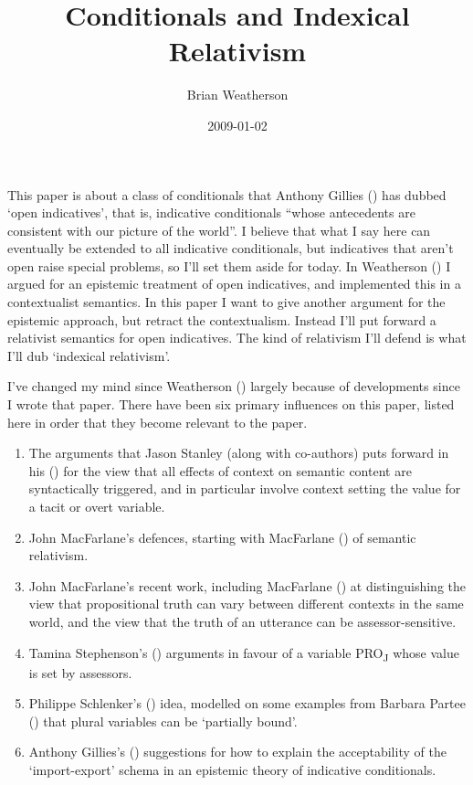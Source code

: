 \documentclass[
  11pt,
  letterpaper,
  DIV=11,
  numbers=noendperiod,
  oneside]{scrartcl}
\title{Conditionals and Indexical Relativism}
\author{Brian Weatherson}
\date{2009-01-02}
\providecommand{\tightlist}{%
  \setlength{\itemsep}{0pt}\setlength{\parskip}{0pt}}\usepackage{longtable,booktabs,array}
\begin{document}
\maketitle
This paper is about a class of conditionals that Anthony Gillies
() has dubbed `open indicatives',
that is, indicative conditionals ``whose antecedents are consistent with
our picture of the world''. I believe that what I say here can
eventually be extended to all indicative conditionals, but indicatives
that aren't open raise special problems, so I'll set them aside for
today. In Weatherson () I
argued for an epistemic treatment of open indicatives, and implemented
this in a contextualist semantics. In this paper I want to give another
argument for the epistemic approach, but retract the contextualism.
Instead I'll put forward a relativist semantics for open indicatives.
The kind of relativism I'll defend is what I'll dub `indexical
relativism'.

I've changed my mind since Weatherson
() largely because of
developments since I wrote that paper. There have been six primary
influences on this paper, listed here in order that they become relevant
to the paper.

\begin{enumerate}
\def\labelenumi{\arabic{enumi}.}
\tightlist
\item
  The arguments that Jason Stanley (along with co-authors) puts forward
  in his () for the view that all
  effects of context on semantic content are syntactically triggered,
  and in particular involve context setting the value for a tacit or
  overt variable.
\item
  John MacFarlane's defences, starting with MacFarlane
  () of semantic relativism.
\item
  John MacFarlane's recent work, including MacFarlane
  () at distinguishing the view
  that propositional truth can vary between different contexts in the
  same world, and the view that the truth of an utterance can be
  assessor-sensitive.
\item
  Tamina Stephenson's () arguments in
  favour of a variable PRO\textsubscript{J} whose value is set by
  assessors.
\item
  Philippe Schlenker's () idea,
  modelled on some examples from Barbara Partee
  () that plural variables can be
  `partially bound'.
\item
  Anthony Gillies's ()
  suggestions for how to explain the acceptability of the
  `import-export' schema in an epistemic theory of indicative
  conditionals.
\end{enumerate}
\end{document}

